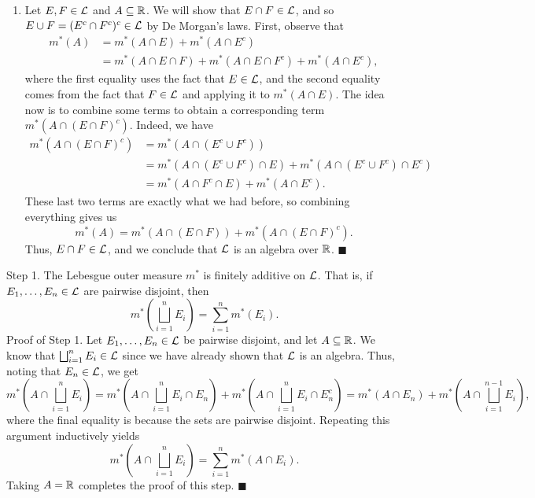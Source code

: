 \begin{pf}
\begin{enumerate}[(1)]
        \item Let $E, F \in {\cal L}$ and $A \subseteq \mathbb{R}$. We will 
        show that $E \cap F \in {\cal L}$, and so $E \cup F = 
        (E^c \cap F^c)^c \in {\cal L}$ by De Morgan's laws. First, 
        observe that 
        \begin{align*}
            m^*(A) &= m^*(A \cap E) + m^*(A \cap E^c) \\ 
            &= m^*(A \cap E \cap F) + m^*(A \cap E \cap F^c) 
            + m^*(A \cap E^c),
        \end{align*}
        where the first equality uses the fact that $E \in {\cal L}$, 
        and the second equality comes from the fact that $F \in {\cal L}$ 
        and applying it to $m^*(A \cap E)$. The idea now is to combine 
        some terms to obtain a corresponding term $m^*(A \cap (E \cap F)^c)$. 
        Indeed, we have 
        \begin{align*}
            m^*(A \cap (E \cap F)^c) 
            &= m^*(A \cap (E^c \cup F^c)) \\ 
            &= m^*(A \cap (E^c \cup F^c) \cap E) + m^*(A \cap (E^c \cup F^c) \cap E^c) \\ 
            &= m^*(A \cap F^c \cap E) + m^*(A \cap E^c). 
        \end{align*}
        These last two terms are exactly what we had before, so combining
        everything gives us 
        \[ m^*(A) = m^*(A \cap (E \cap F)) + m^*(A \cap (E \cap F)^c). \] 
        Thus, $E \cap F \in {\cal L}$, and we conclude that ${\cal L}$ is 
        an algebra over $\mathbb{R}$. \hfill $\blacksquare$

    \end{enumerate}

    {\sc Step 1.} The Lebesgue outer measure $m^*$ is finitely additive 
    on ${\cal L}$. That is, if $E_1, \dots, E_n \in {\cal L}$ are pairwise 
    disjoint, then 
    \[ m^*\!\left( \bigsqcup_{i=1}^n E_i \right) = \sum_{i=1}^n m^*(E_i). \] 
    {\sc Proof of Step 1.} Let $E_1, \dots, E_n \in {\cal L}$ be 
    pairwise disjoint, and let $A \subseteq \mathbb{R}$. We know that 
    $\bigsqcup_{i=1}^n E_i \in {\cal L}$ since we have already shown that 
    ${\cal L}$ is an algebra. Thus, noting that $E_n \in {\cal L}$, we get
    \[ m^*\!\left(A \cap \bigsqcup_{i=1}^n E_i \right) = 
    m^*\!\left(A \cap \bigsqcup_{i=1}^n E_i \cap E_n \right) 
    + m^*\!\left( A \cap \bigsqcup_{i=1}^n E_i \cap E_n^c \right) 
    = m^*(A \cap E_n) + m^*\!\left( A \cap \bigsqcup_{i=1}^{n-1} E_i \right), \] 
    where the final equality is because the sets are pairwise disjoint. 
    Repeating this argument inductively yields
    \[ m^*\left( A \cap \bigsqcup_{i=1}^n E_i \right) = 
    \sum_{i=1}^n m^*(A \cap E_i). \] 
    Taking $A = \mathbb{R}$ completes the proof of this step. \hfill $\blacksquare$


\end{pf}
